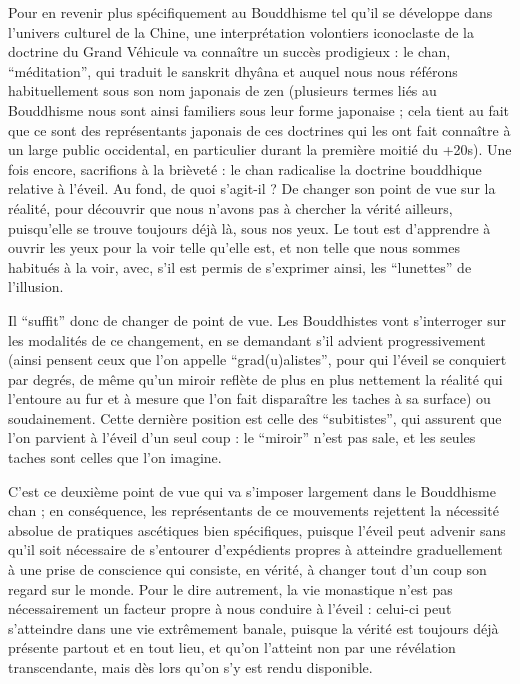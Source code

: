 Pour en revenir plus spécifiquement au Bouddhisme tel qu'il se développe dans
l'univers culturel de la Chine, une interprétation volontiers iconoclaste de la doctrine du
Grand Véhicule va connaître un succès prodigieux : le chan, ``méditation'', qui traduit
le sanskrit dhyâna et auquel nous nous référons habituellement sous son nom japonais
de zen (plusieurs termes liés au Bouddhisme nous sont ainsi familiers sous leur forme
japonaise ; cela tient au fait que ce sont des représentants japonais de ces doctrines qui
les ont fait connaître à un large public occidental, en particulier durant la première moitié du +20s).
Une fois encore, sacrifions à la brièveté : le chan radicalise la
doctrine bouddhique relative à l'éveil.
Au fond, de quoi s'agit-il ? De changer son point
de vue sur la réalité, pour découvrir que nous n'avons pas à chercher la vérité ailleurs,
puisqu'elle se trouve toujours déjà là, sous nos yeux.
Le tout est d'apprendre à ouvrir les
yeux pour la voir telle qu'elle est, et non telle que nous sommes habitués à la voir, avec,
s'il est permis de s'exprimer ainsi, les ``lunettes'' de l'illusion.

Il ``suffit'' donc de changer de point de vue.
Les Bouddhistes vont s'interroger sur les
modalités de ce changement, en se demandant s'il advient progressivement (ainsi pensent ceux que l'on appelle ``grad(u)alistes'', pour qui l'éveil se conquiert par degrés, de
même qu'un miroir reflète de plus en plus nettement la réalité qui l'entoure au fur et à
mesure que l'on fait disparaître les taches à sa surface) ou soudainement.
Cette dernière
position est celle des ``subitistes'', qui assurent que l'on parvient à l'éveil d'un seul
coup : le ``miroir'' n'est pas sale, et les seules taches sont celles que l'on imagine.

C'est ce deuxième point de vue qui va s'imposer largement dans le Bouddhisme chan ;
en conséquence, les représentants de ce mouvements rejettent la nécessité absolue de
pratiques ascétiques bien spécifiques, puisque l'éveil peut advenir sans qu'il soit nécessaire de s'entourer d'expédients propres à atteindre graduellement à une prise de
conscience qui consiste, en vérité, à changer tout d'un coup son regard sur le monde.
Pour le dire autrement, la vie monastique n'est pas nécessairement un facteur propre à
nous conduire à l'éveil : celui-ci peut s'atteindre dans une vie extrêmement banale,
puisque la vérité est toujours déjà présente partout et en tout lieu, et qu'on l'atteint non
par une révélation transcendante, mais dès lors qu'on s'y est rendu disponible.

